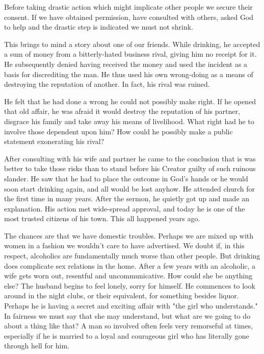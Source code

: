 \begin{biblechapter}
Before taking drastic action which might implicate other people we secure their consent.  If we have obtained permission, have consulted with others, asked God to help and the drastic step is indicated we must not shrink.

This brings to mind a story about one of our friends.  While drinking, he accepted a sum of money from a bitterly-hated business rival, giving him no receipt for it.  He subsequently denied having received the money and used the incident as a basis for discrediting the man.  He thus used his own wrong-doing as a means of destroying the reputation of another.  In fact, his rival was ruined.

He felt that he had done a wrong he could not possibly make right.  If he opened that old affair, he was afraid it would destroy the reputation of his partner, disgrace his family and take away his means of livelihood.  What right had he to involve those dependent upon him?  How could he possibly make a public statement exonerating his rival?

After consulting with his wife and partner he came to the conclusion that is was better to take those risks than to stand before his Creator guilty of such ruinous slander.  He saw that he had to place the outcome in God's hands or he would soon start drinking again, and all would be lost anyhow.  He attended church for the first time in many years.  After the sermon, he quietly got up and made an explanation.  His action met wide-spread approval, and today he is one of the most trusted citizens of his town.  This all happened years ago.

The chances are that we have domestic troubles.  Perhaps we are mixed up with women in a fashion we wouldn't care to have advertised.  We doubt if, in this respect, alcoholics are fundamentally much worse than other people.  But drinking does complicate sex relations in the home.  After a few years with an alcoholic, a wife gets worn out, resentful and uncommunicative.  How could she be anything else?  The husband begins to feel lonely, sorry for himself.  He commences to look around in the night clubs, or their equivalent, for something besides liquor.  Perhaps he is having a secret and exciting affair with "the girl who understands."  In fairness we must say that she may understand, but what are we going to do about a thing like that?  A man so involved often feels very remorseful at times, especially if he is married to a loyal and courageous girl who has literally gone through hell for him.


\end{biblechapter}
